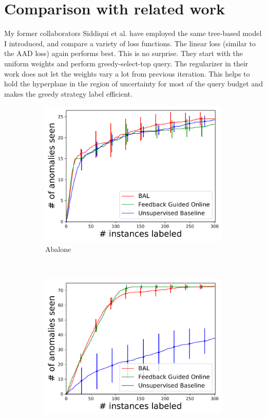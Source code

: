 \documentclass{article} %
\begin{document}
\section{Comparison with related work}
My former collaborators Siddiqui et al. have employed the same tree-based model I introduced, and compare a variety of loss functions. The linear loss (similar to the AAD loss) again performs best. This is no surprise. They start with the uniform weights and perform greedy-select-top query. The regularizer in their work does not let the weights vary a lot from previous iteration. This helps to hold the hyperplane in the region of uncertainty for most of the query budget and makes the greedy strategy label efficient.
\begin{figure}[h]
	\centering
	\captionsetup{labelformat=empty}
	\begin{subfigure}[b]{0.23\textwidth}
		\includegraphics[width=\textwidth]{fbonline/num_seen-abalone.pdf}
		\caption{Abalone}
		\label{fig:angles_abalone}
	\end{subfigure}
	~
	\begin{subfigure}[b]{0.23\textwidth}
		\includegraphics[width=\textwidth]{fbonline/num_seen-ann_thyroid_1v3.pdf}

\end{subfigure}
\end{figure}
\end{document}
